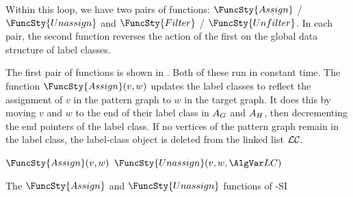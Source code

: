 Within this loop, we have two pairs of functions:
$\FuncSty{Assign}$ / $\FuncSty{Unassign}$
and
$\FuncSty{Filter}$ / $\FuncSty{Unfilter}$.  In each pair, the
second function reverses the action of the first on the global
data structure of label classes.

The first pair of functions is shown in .
Both of these run in constant time.
The function $\FuncSty{Assign}(v,w)$ updates the label classes to reflect
the assignment of $v$ in the pattern graph to $w$ in the target graph.  It 
does this by moving $v$ and $w$ to the end of their label class in
$A_G$ and $A_H$, then decrementing the end pointers of the label class.
If no vertices of the pattern graph remain in the label class, the label-class
object is deleted from the linked list $\mathcal{LC}$.

\begin{algorithm}[tb]
\AlgorithmFontSize
\DontPrintSemicolon
\nl $\FuncSty{Assign}(v,w)$ \;
\nl {}
\;
\nl $\FuncSty{Unassign}(v,w,\LC)$ \;
\nl {}
\caption{The $\FuncSty{Assign}$ and $\FuncSty{Unassign}$ functions of \McSplit-SI}
\label{McSplitSIAlgAssign}
\end{algorithm}


